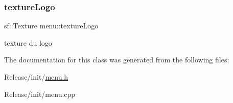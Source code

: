 \subsubsection{\texorpdfstring{texture\+Logo}{textureLogo}}
{\footnotesize\ttfamily sf\+::\+Texture menu\+::texture\+Logo}

texture du logo 

The documentation for this class was generated from the following files\+:\begin{DoxyCompactItemize}
\item 
Release/init/\mbox{\hyperlink{menu_8h}{menu.\+h}}\item 
Release/init/menu.\+cpp\end{DoxyCompactItemize}

